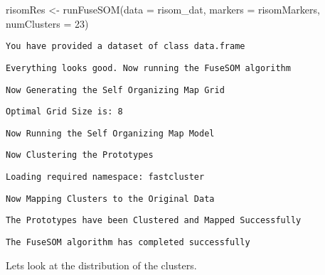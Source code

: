 \documentclass[
  letterpaper,
  DIV=11,
  numbers=noendperiod]{scrreprt}
\newenvironment{Shaded}{\begin{snugshade}}{\end{snugshade}}
\newcommand{\AttributeTok}[1]{\textcolor[rgb]{0.40,0.45,0.13}{#1}}
\newcommand{\CommentTok}[1]{\textcolor[rgb]{0.37,0.37,0.37}{#1}}
\newcommand{\DecValTok}[1]{\textcolor[rgb]{0.68,0.00,0.00}{#1}}
\newcommand{\FunctionTok}[1]{\textcolor[rgb]{0.28,0.35,0.67}{#1}}
\newcommand{\NormalTok}[1]{\textcolor[rgb]{0.00,0.23,0.31}{#1}}
\newcommand{\OtherTok}[1]{\textcolor[rgb]{0.00,0.23,0.31}{#1}}
\newcommand{\SpecialCharTok}[1]{\textcolor[rgb]{0.37,0.37,0.37}{#1}}
\begin{document}
\begin{Shaded}
\begin{Highlighting}[]
\NormalTok{risomRes }\OtherTok{\textless{}{-}} \FunctionTok{runFuseSOM}\NormalTok{(}\AttributeTok{data =}\NormalTok{ risom\_dat, }\AttributeTok{markers =}\NormalTok{ risomMarkers, }
                        \AttributeTok{numClusters =} \DecValTok{23}\NormalTok{)}
\end{Highlighting}
\end{Shaded}

\begin{verbatim}
You have provided a dataset of class data.frame
\end{verbatim}

\begin{verbatim}
Everything looks good. Now running the FuseSOM algorithm
\end{verbatim}

\begin{verbatim}
Now Generating the Self Organizing Map Grid
\end{verbatim}

\begin{verbatim}
Optimal Grid Size is: 8
\end{verbatim}

\begin{verbatim}
Now Running the Self Organizing Map Model
\end{verbatim}

\begin{verbatim}
Now Clustering the Prototypes
\end{verbatim}

\begin{verbatim}
Loading required namespace: fastcluster
\end{verbatim}

\begin{verbatim}
Now Mapping Clusters to the Original Data
\end{verbatim}

\begin{verbatim}
The Prototypes have been Clustered and Mapped Successfully
\end{verbatim}

\begin{verbatim}
The FuseSOM algorithm has completed successfully
\end{verbatim}

Lets look at the distribution of the clusters.

\begin{Shaded}
\end{Shaded}
\end{document}

